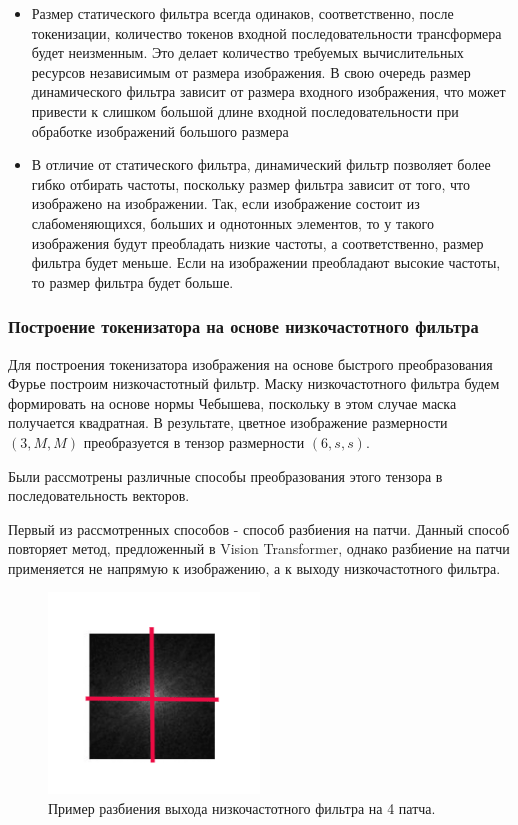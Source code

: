 \begin{itemize}
    \item Размер статического фильтра всегда одинаков, соответственно, после токенизации, количество токенов входной последовательности трансформера будет неизменным. Это делает количество требуемых вычислительных ресурсов независимым от размера изображения. В свою очередь размер динамического фильтра зависит от размера входного изображения, что может привести к слишком большой длине входной последовательности при обработке изображений большого размера
    \item В отличие от статического фильтра, динамический фильтр позволяет более гибко отбирать частоты, поскольку размер фильтра зависит от того, что изображено на изображении. Так, если изображение состоит из слабоменяющихся, больших и однотонных элементов, то у такого изображения будут преобладать низкие частоты, а соответственно, размер фильтра будет меньше. Если на изображении преобладают высокие частоты, то размер фильтра будет больше.
\end{itemize}



\subsubsection{Построение токенизатора на основе низкочастотного фильтра}

Для построения токенизатора изображения на основе быстрого преобразования Фурье построим низкочастотный фильтр. Маску низкочастотного фильтра будем формировать на основе нормы Чебышева, поскольку в этом случае маска получается квадратная. В результате, цветное изображение размерности $(3, M, M)$ преобразуется в тензор размерности $(6, s, s)$. 

Были рассмотрены различные способы преобразования этого тензора в последовательность векторов.

Первый из рассмотренных способов - способ разбиения на патчи. Данный способ повторяет метод, предложенный в Vision Transformer, однако разбиение на патчи применяется не напрямую к изображению, а к выходу низкочастотного фильтра.

\begin{figure}[H]
    \centering
    \includegraphics[width=0.5\textwidth]
    {images/research/fourier/patches_split.png}
    \caption{Пример разбиения выхода низкочастотного фильтра на 4 патча.}
\end{figure}

